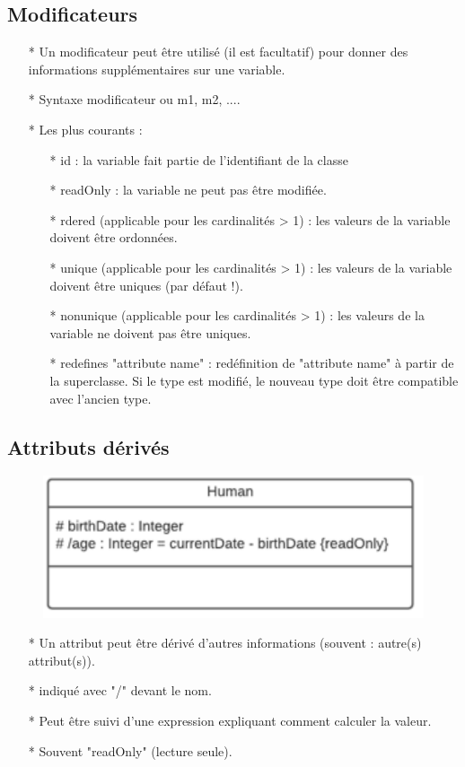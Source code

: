 \documentclass[12pt]{article}
\begin{document}
\subsection{Modificateurs}
\begin{itemize}
	\item[* ] Un modificateur peut être utilisé (il est facultatif) pour donner des informations supplémentaires sur une variable.
	\item[* ] Syntaxe {modificateur} ou {m1, m2, ...}.
	\item[* ] Les plus courants :
	\begin{itemize}
		\item[* ] id : la variable fait partie de l'identifiant de la classe
		\item[* ] readOnly : la variable ne peut pas être modifiée.
		\item[* ] rdered (applicable pour les cardinalités > 1) : les valeurs de la variable doivent être ordonnées.
		\item[* ] unique (applicable pour les cardinalités > 1) : les valeurs de la variable doivent être uniques (par défaut !).
		\item[* ] nonunique (applicable pour les cardinalités > 1) : les valeurs de la variable ne doivent pas être uniques.
		\item[* ]  redefines "attribute name" : redéfinition de "attribute name" à partir de la superclasse. Si le type
		est modifié, le nouveau type doit être compatible avec l'ancien type.
	\end{itemize}
\end{itemize}
\subsection{Attributs dérivés}
\begin{figure}[!hbtp]
	\centering
	\includegraphics[scale=0.75]{Capture6.PNG}
\end{figure}
\begin{itemize}
	\item[* ] Un attribut peut être dérivé d'autres
	informations (souvent : autre(s) attribut(s)).
	\item[* ] indiqué avec "/" devant le nom.
	\item[* ] Peut être suivi d'une expression expliquant
	comment calculer la valeur.
	\item[* ] Souvent "readOnly" (lecture seule).
\end{itemize}
\end{document}
